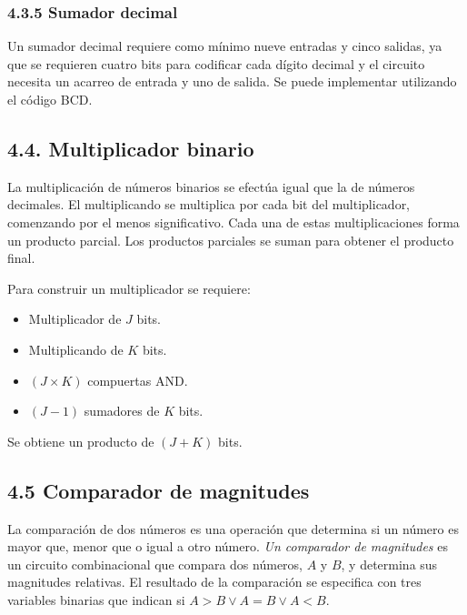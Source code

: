 \subsubsection*{4.3.5 Sumador decimal}
Un sumador decimal requiere como m\'{i}nimo nueve entradas y cinco salidas, ya que se requieren
cuatro bits para codificar cada d\'{i}gito decimal y el circuito necesita un acarreo de entrada y
uno de salida. Se puede implementar utilizando el c\'{o}digo BCD.

\subsection*{4.4. Multiplicador binario}
La multiplicaci\'{o}n de n\'{u}meros binarios se efect\'{u}a igual que la de n\'{u}meros decimales.
El multiplicando se multiplica por cada bit del multiplicador, comenzando por el menos significativo.
Cada una de estas multiplicaciones forma un producto parcial. Los productos parciales se suman para
obtener el producto final.
\begin{flushleft}
    Para construir un multiplicador se requiere:
\end{flushleft}
\begin{itemize}
    \item Multiplicador de $J$ bits.
    \item Multiplicando de $K$ bits.
    \item $(J \times K)$ compuertas AND.
    \item $(J - 1)$ sumadores de $K$ bits.
\end{itemize}
Se obtiene un producto de $(J + K)$ bits.

\subsection*{4.5 Comparador de magnitudes}
La comparaci\'{o}n de dos n\'{u}meros es una operaci\'{o}n que determina si un n\'{u}mero es mayor que,
menor que o igual a otro n\'{u}mero. \textit{Un comparador de magnitudes} es un circuito combinacional
que compara dos n\'{u}meros, $A$ y $B$, y determina sus magnitudes relativas. El resultado de la comparaci\'{o}n
se especifica con tres variables binarias que indican si $A > B \vee A = B \vee A < B$.

